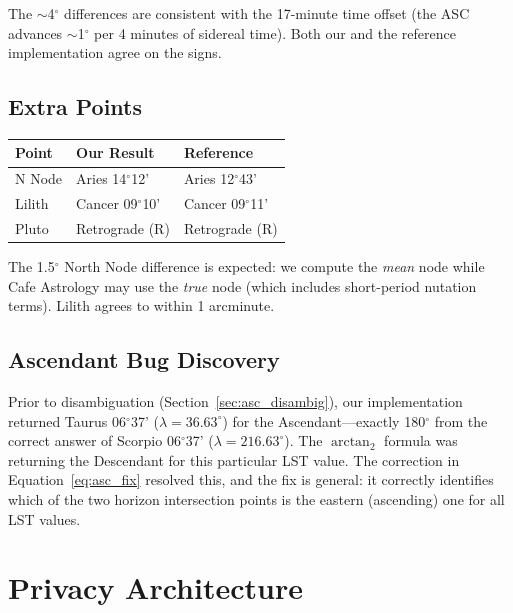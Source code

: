 \documentclass[11pt,letterpaper,twocolumn]{article}
\begin{document}
The $\sim$4$^\circ$ differences are consistent with the 17-minute time offset (the ASC advances $\sim$1$^\circ$ per 4 minutes of sidereal time). Both our and the reference implementation agree on the signs.

\subsection{Extra Points}

\begin{center}
\begin{tabular}{lll}
\toprule
\textbf{Point} & \textbf{Our Result} & \textbf{Reference} \\
\midrule
N Node & Aries 14$^\circ$12' & Aries 12$^\circ$43' \\
Lilith & Cancer 09$^\circ$10' & Cancer 09$^\circ$11' \\
Pluto & Retrograde (R) & Retrograde (R) \\
\bottomrule
\end{tabular}
\end{center}

The 1.5$^\circ$ North Node difference is expected: we compute the \textit{mean} node while Cafe Astrology may use the \textit{true} node (which includes short-period nutation terms). Lilith agrees to within 1 arcminute.

\subsection{Ascendant Bug Discovery}

Prior to disambiguation (Section~\ref{sec:asc_disambig}), our implementation returned Taurus 06$^\circ$37' ($\lambda = 36.63^\circ$) for the Ascendant---exactly 180$^\circ$ from the correct answer of Scorpio 06$^\circ$37' ($\lambda = 216.63^\circ$). The $\arctan_2$ formula was returning the Descendant for this particular LST value. The correction in Equation~\ref{eq:asc_fix} resolved this, and the fix is general: it correctly identifies which of the two horizon intersection points is the eastern (ascending) one for all LST values.

\section{Privacy Architecture}\label{sec:privacy}
\end{document}
